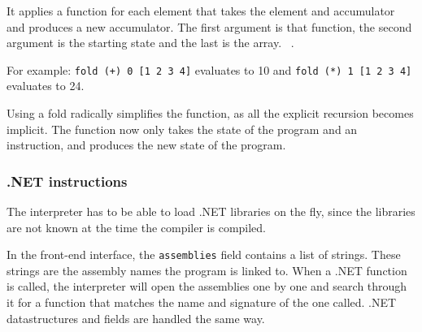 It applies a function for each element that takes the element and accumulator and produces a new accumulator.
The first argument is that function, the second argument is the starting state and the last is the array.
~\cite{realworldhaskellch4}.

For example: \texttt{fold (+) 0 [1 2 3 4]} evaluates to 10 and \texttt{fold (*) 1 [1 2 3 4]} evaluates to 24.

Using a fold radically simplifies the function, as all the explicit recursion becomes implicit.
The function now only takes the state of the program and an instruction, and produces the new state of the program.

\subsubsection{.NET instructions}
The interpreter has to be able to load .NET libraries on the fly, since the libraries are not known at the time the compiler is compiled.

In the front-end interface, the \verb|assemblies| field contains a list of strings.
These strings are the assembly names the program is linked to.
When a .NET function is called, the interpreter will open the assemblies one by one and search through it for a function that matches the name and signature of the one called.
.NET datastructures and fields are handled the same way.


